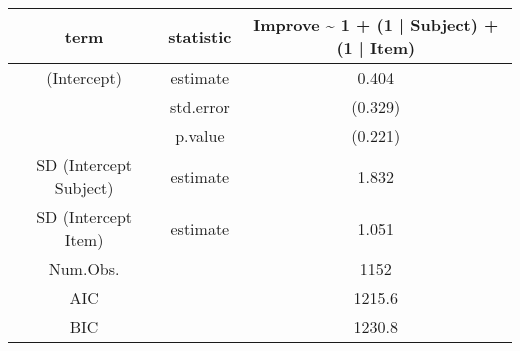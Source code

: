 \begin{longtable}{ccc}
\toprule
term & statistic & Improve \textasciitilde{} 1 + (1 | Subject) + (1 | Item) \\ 
\midrule
(Intercept) & estimate & 0.404 \\ 
 & std.error & (0.329) \\ 
 & p.value & (0.221) \\ 
SD (Intercept Subject) & estimate & 1.832 \\ 
SD (Intercept Item) & estimate & 1.051 \\ 
Num.Obs. &  & 1152 \\ 
AIC &  & 1215.6 \\ 
BIC &  & 1230.8 \\ 
\bottomrule
\end{longtable}

